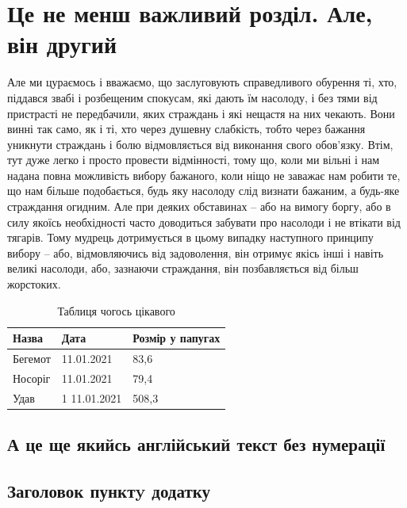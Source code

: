 \documentclass{report_ndr}
\begin{document}
\chapter{Це не менш важливий розділ. Але, він другий}

Але ми цураємось і вважаємо, що заслуговують справедливого обурення ті, хто,
піддався звабі і розбещеним спокусам, які дають їм насолоду, і без тями від
пристрасті не передбачили, яких страждань і які нещастя на них чекають. Вони
винні так само, як і ті, хто через душевну слабкість, тобто через бажання
уникнути страждань і болю відмовляється від виконання свого обов’язку. Втім, тут
дуже легко і просто провести відмінності, тому що, коли ми вільні і нам надана
повна можливість вибору бажаного, коли ніщо не заважає нам робити те, що нам
більше подобається, будь яку насолоду слід визнати бажаним, а будь-яке
страждання огидним. Але при деяких обставинах – або на вимогу боргу, або в силу
якоїсь необхідності часто доводиться забувати про насолоди і не втікати від
тягарів. Тому мудрець дотримується в цьому випадку наступного принципу вибору –
або, відмовляючись від задоволення, він отримує якісь інші і навіть великі
насолоди, або, зазнаючи страждання, він позбавляється від більш жорстоких.

\begin{table}[h!]
    \caption{Таблиця чогось цікавого}
    \centering
    \begin{tabular}{| l | l | l |}
    \hline
    Назва & Дата & Розмір у папугах \\ \hline
    Бегемот & 11.01.2021 & 83,6 \\ \hline
    Носоріг & 11.01.2021 & 79,4 \\ \hline
    Удав & 1 11.01.2021 & 508,3 \\
    \hline
    \end{tabular}
\end{table}

\section*{А це ще якийсь англійський текст без нумерації}

\lipsum[1-2]

\begin{appendices}


\lipsum[3-8]

\section{Заголовок пунктy додатку}

\lipsum[9]


\lipsum[10-12]

\end{appendices}
\end{document}
